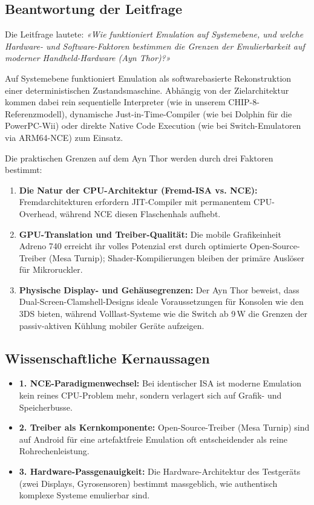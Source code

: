 \documentclass[12pt,a4paper]{scrartcl}
\begin{document}
\subsection{Beantwortung der Leitfrage}
Die Leitfrage lautete: \textit{«Wie funktioniert Emulation auf Systemebene, und welche Hardware- und Software-Faktoren bestimmen die Grenzen der Emulierbarkeit auf moderner Handheld-Hardware (Ayn Thor)?»}

Auf Systemebene funktioniert Emulation als softwarebasierte Rekonstruktion einer deterministischen Zustandsmaschine. Abhängig von der Zielarchitektur kommen dabei rein sequentielle Interpreter (wie in unserem CHIP-8-Referenzmodell), dynamische Just-in-Time-Compiler (wie bei Dolphin für die PowerPC-Wii) oder direkte Native Code Execution (wie bei Switch-Emulatoren via ARM64-NCE) zum Einsatz.

Die praktischen Grenzen auf dem Ayn Thor werden durch drei Faktoren bestimmt:
\begin{enumerate}[leftmargin=1.8em]
    \item \textbf{Die Natur der CPU-Architektur (Fremd-ISA vs. NCE):} Fremdarchitekturen erfordern JIT-Compiler mit permanentem CPU-Overhead, während NCE diesen Flaschenhals aufhebt.
    \item \textbf{GPU-Translation und Treiber-Qualität:} Die mobile Grafikeinheit Adreno 740 erreicht ihr volles Potenzial erst durch optimierte Open-Source-Treiber (Mesa Turnip); Shader-Kompilierungen bleiben der primäre Auslöser für Mikroruckler.
    \item \textbf{Physische Display- und Gehäusegrenzen:} Der Ayn Thor beweist, dass Dual-Screen-Clamshell-Designs ideale Voraussetzungen für Konsolen wie den 3DS bieten, während Volllast-Systeme wie die Switch ab 9\,W die Grenzen der passiv-aktiven Kühlung mobiler Geräte aufzeigen.
\end{enumerate}

\subsection{Wissenschaftliche Kernaussagen}
\begin{itemize}[leftmargin=1.8em]
    \item \textbf{1. NCE-Paradigmenwechsel:} Bei identischer ISA ist moderne Emulation kein reines CPU-Problem mehr, sondern verlagert sich auf Grafik- und Speicherbusse.
    \item \textbf{2. Treiber als Kernkomponente:} Open-Source-Treiber (Mesa Turnip) sind auf Android für eine artefaktfreie Emulation oft entscheidender als reine Rohrechenleistung.
    \item \textbf{3. Hardware-Passgenauigkeit:} Die Hardware-Architektur des Testgeräts (zwei Displays, Gyrosensoren) bestimmt massgeblich, wie authentisch komplexe Systeme emulierbar sind.
\end{itemize}
\end{document}
